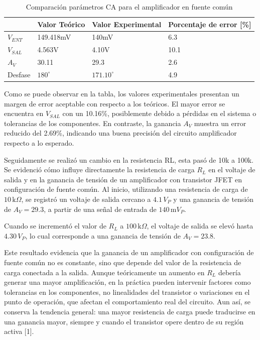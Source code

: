 \documentclass[journal]{IEEEtran}
\begin{document}
\begin{table}[h]
    \caption{Comparación parámetros CA para el amplificador en fuente común}
    \centering
    \renewcommand{\arraystretch}{1.2} %
    \begin{tabular}{|l|p{2cm}|p{2cm}|p{2cm}|}
        \hline
        & \textbf{Valor Teórico} & \textbf{Valor Experimental} & \textbf{Porcentaje de error [\%]} \\
        \hline
        \( V_{ENT} \) & 149.418mV  & 140mV  & 6.3 \\
        \hline
        \( V_{SAL} \) & 4.563V   & 4.10V  & 10.1 \\
        \hline
        \( A_V \) & 30.11 & 29.3 & 2.6 \\
        \hline
        Desfase & $180^\circ$  & $171.10^\circ$  & 4.9 \\
        \hline
    \end{tabular}
    \label{tab:CA}
\end{table}
\par Como se puede observar en la tabla, los valores experimentales presentan un margen de error aceptable con respecto a los teóricos. El mayor error se encuentra en $V_{SAL}$ con un 10.16\%, posiblemente debido a pérdidas en el sistema o tolerancias de los componentes. En contraste, la ganancia $A_V$ muestra un error reducido del 2.69\%, indicando una buena precisión del circuito amplificador respecto a lo esperado.

\par Seguidamente se realizó un cambio en la resistencia RL, esta pasó de 10k a 100k.
Se evidenció cómo influye directamente la resistencia de carga \( R_L \) en el voltaje de salida y en la ganancia de tensión de un amplificador con transistor JFET en configuración de fuente común. Al inicio, utilizando una resistencia de carga de \( 10\,\text{k}\Omega \), se registró un voltaje de salida cercano a \( 4.1\,V_P \) y una ganancia de tensión de \( A_V = 29.3 \), a partir de una señal de entrada de \( 140\,\text{m}V_P \).

Cuando se incrementó el valor de \( R_L \) a \( 100\,\text{k}\Omega \), el voltaje de salida se elevó hasta \( 4.30\,V_P \), lo cual corresponde a una ganancia de tensión de \( A_V = 23.8 \).

Este resultado evidencia que la ganancia de un amplificador con configuración de fuente común no es constante, sino que depende del valor de la resistencia de carga conectada a la salida. Aunque teóricamente un aumento en \( R_L \) debería generar una mayor amplificación, en la práctica pueden intervenir factores como tolerancias en los componentes, no linealidades del transistor o variaciones en el punto de operación, que afectan el comportamiento real del circuito. Aun así, se conserva la tendencia general: una mayor resistencia de carga puede traducirse en una ganancia mayor, siempre y cuando el transistor opere dentro de su región activa [1].
\end{document}
